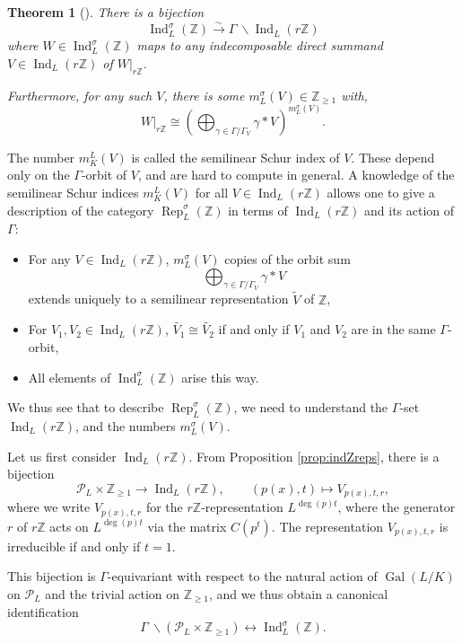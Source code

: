 \documentclass[10pt, reqno, hidelinks]{amsart}
\DeclareMathOperator{\Gal}{Gal}
\DeclareMathOperator{\Rep}{Rep}
\DeclareMathOperator{\Ind}{Ind}
\newcommand{\bZ}{{\mathbb Z}}
\newcommand{\sP}{{\mathcal P}}
\newtheorem{thm}{Theorem}
\numberwithin{thm}{subsection}
\theoremstyle{definition}
\begin{document}
\begin{thm}[{\cite[Theorem B]{TAYSchur}}]\label{thm:descofrestriction}
	There is a bijection
	\[
		\Ind_L^{\sigma}(\bZ) \xrightarrow{\sim} \Gamma \: \backslash \Ind_{L}(r \bZ)
	\]
	where $W \in \Ind_L^{\sigma}(\bZ)$ maps to any indecomposable direct summand $V \in \Ind_L(r \bZ)$ of $W|_{r \bZ}$.
	
	Furthermore, for any such $V$, there is some $m_L^{\sigma}(V) \in \bZ_{\geq 1}$ with,
	\[
		W|_{r \bZ} \cong \left( \bigoplus_{\gamma \in \Gamma / \Gamma_V} \gamma *V \right)^{m_L^{\sigma}(V)}.
	\]
\end{thm}

The number $m_K^L(V)$ is called the semilinear Schur index of $V$. These depend only on the $\Gamma$-orbit of $V$, and are hard to compute in general. A knowledge of the semilinear Schur indices $m_K^L(V)$ for all $V \in \Ind_L(r \bZ)$ allows one to give a description of the category $\Rep_L^{\sigma}(\bZ)$ in terms of $\Ind_{L}(r \bZ)$ and its action of $\Gamma$: 
\begin{itemize}
\item For any $V \in \Ind_L(r \bZ)$, $m_L^{\sigma}(V)$ copies of the orbit sum
\[
\bigoplus_{\gamma \in \Gamma / \Gamma_V} \gamma * V
\]
extends uniquely to a semilinear representation $\widetilde{V}$ of $\bZ$,
\item For $V_1, V_2 \in \Ind_L(r \bZ)$, $\widetilde{V_1} \cong \widetilde{V_2}$ if and only if $V_1$ and $V_2$ are in the same $\Gamma$-orbit,
\item All elements of $\Ind_{L}^{\sigma}(\bZ)$ arise this way.
\end{itemize}

We thus see that to describe $\Rep_L^{\sigma}(\bZ)$, we need to understand the $\Gamma$-set $\Ind_L(r \bZ)$, and the numbers $m_L^{\sigma}(V)$.

Let us first consider $\Ind_L(r \bZ)$. From Proposition \ref{prop:indZreps}, there is a bijection
\[
\sP_L \times \bZ_{\geq 1} \rightarrow \Ind_L(r \bZ), \qquad (p(x),t) \mapsto V_{p(x),t,r},
\]
where we write $V_{p(x),t,r}$ for the $r \bZ$-representation $L^{\deg(p)t}$, where the generator $r$ of $r \bZ$ acts on $L^{\deg(p)t}$ via the matrix $C(p^t)$. The representation $V_{p(x), t, r}$ is irreducible if and only if $t = 1$. 

This bijection is $\Gamma$-equivariant with respect to the natural action of $\Gal(L/K)$ on $\sP_L$ and the trivial action on $\bZ_{\geq 1}$, and we thus obtain a canonical identification
\[
\Gamma \: \backslash (\sP_L \times \bZ_{\geq 1}) \leftrightarrow \Ind_L^{\sigma}(\bZ).
\]
\end{document}
